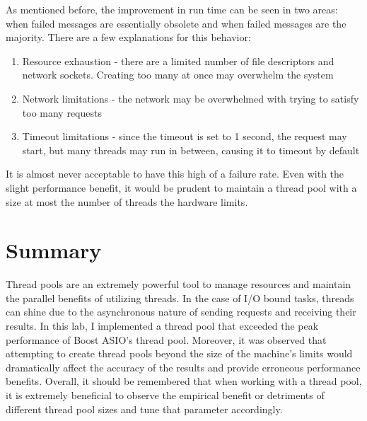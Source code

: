 \documentclass[12pt]{article}
\begin{document}
   As mentioned before, the improvement in run time can be seen in two areas: when failed messages are essentially obsolete and when failed messages are the majority. There are a few explanations for this behavior:
    \begin{enumerate}
        \item Resource exhaustion - there are a limited number of file descriptors and network sockets. Creating too many at once may overwhelm the system
        \item Network limitations - the network may be overwhelmed with trying to satisfy too many requests
        \item Timeout limitations - since the timeout is set to 1 second, the request may start, but many threads may run in between, causing it to timeout by default
    \end{enumerate}

    It is almost never acceptable to have this high of a failure rate. Even with the slight performance benefit, it would be prudent to maintain a thread pool with a size at most the number of threads the hardware limits.
    
\section{Summary}

Thread pools are an extremely powerful tool to manage resources and maintain the parallel benefits of utilizing threads. In the case of I/O bound tasks, threads can shine due to the asynchronous nature of sending requests and receiving their results. In this lab, I implemented a thread pool that exceeded the peak performance of Boost ASIO's thread pool. Moreover, it was observed that attempting to create thread pools beyond the size of the machine's limits would dramatically affect the accuracy of the results and provide erroneous performance benefits. Overall, it should be remembered that when working with a thread pool, it is extremely beneficial to observe the empirical benefit or detriments of different thread pool sizes and tune that parameter accordingly.
\end{document}
